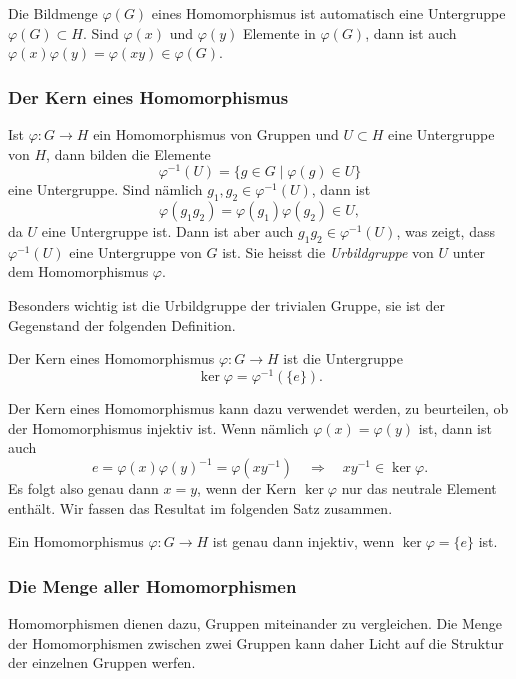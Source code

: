 Die Bildmenge $\varphi(G)$ eines Homomorphismus ist automatisch eine
Untergruppe $\varphi(G)\subset H$.
Sind $\varphi(x)$ und $\varphi(y)$ Elemente in $\varphi(G)$,
dann ist auch $\varphi(x)\varphi(y)=\varphi(xy)\in\varphi(G)$.

%
%
\subsubsection{Der Kern eines Homomorphismus}
Ist $\varphi\colon G\to H$ ein Homomorphismus von Gruppen und
$U\subset H$ eine Untergruppe von $H$, dann bilden die Elemente
\[
\varphi^{-1}(U)
=
\{g\in G\mid \varphi(g)\in U\}
\]
eine Untergruppe.
Sind nämlich $g_1,g_2\in\varphi^{-1}(U)$, dann ist
\[
\varphi(g_1g_2)
=
\varphi(g_1)\varphi(g_2)
\in U,
\]
da $U$ eine Untergruppe ist.
Dann ist aber auch $g_1g_2\in\varphi^{-1}(U)$, was zeigt, dass
$\varphi^{-1}(U)$ eine Untergruppe von $G$ ist.
Sie heisst die {\em Urbildgruppe} von $U$ unter dem Homomorphismus
$\varphi$.

Besonders wichtig ist die Urbildgruppe der trivialen Gruppe,
sie ist der Gegenstand der folgenden Definition.

\begin{definition}
\label{buch:gruppen:definition:def:kern}
Der Kern eines Homomorphismus $\varphi \colon G\to H$ ist die
Untergruppe
\[
\ker \varphi = \varphi^{-1}(\{e\}).
\]
\end{definition}

Der Kern eines Homomorphismus kann dazu verwendet werden, zu beurteilen,
ob der Homomorphismus injektiv ist.
Wenn nämlich $\varphi(x)=\varphi(y)$ ist, dann ist auch
\[
e
=
\varphi(x)\varphi(y)^{-1}
=
\varphi(xy^{-1})
\quad\Rightarrow\quad
xy^{-1} \in\ker\varphi.
\]
Es folgt also genau dann $x=y$, wenn der Kern $\ker\varphi$ nur
das neutrale Element enthält.
Wir fassen das Resultat im folgenden Satz zusammen.

\begin{satz}
Ein Homomorphismus $\varphi\colon G\to H$ ist genau dann injektiv,
wenn $\ker\varphi=\{e\}$ ist.
\end{satz}

%
%
\subsubsection{Die Menge aller Homomorphismen}
Homomorphismen dienen dazu, Gruppen miteinander zu vergleichen.
Die Menge der Homomorphismen zwischen zwei Gruppen kann daher
Licht auf die Struktur der einzelnen Gruppen werfen.

